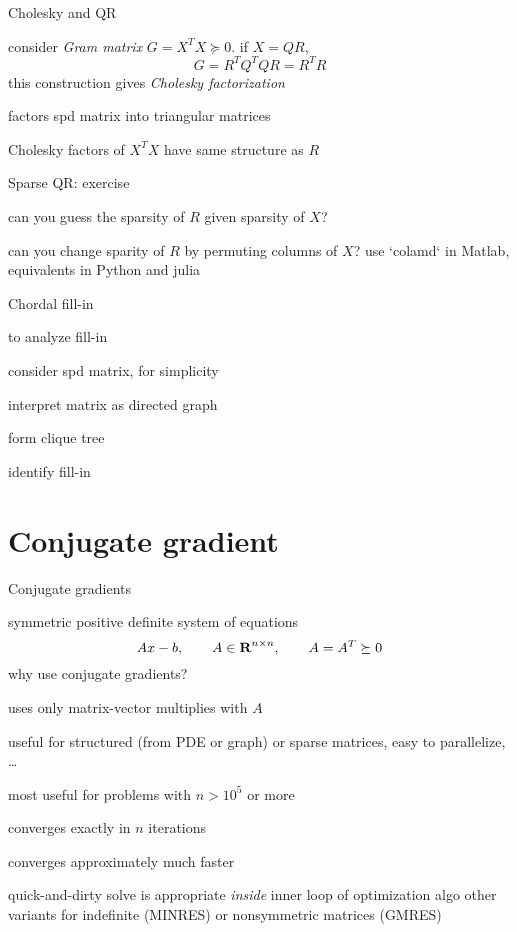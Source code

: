 \documentclass[presentation,xcolor={usenames,dvipsnames}]{beamer}
\begin{document}
\begin{frame}{Cholesky and QR}

consider \emph{Gram matrix} $G = X^T X \succeq 0$. if $X = QR$,
\[
G = R^T Q^T Q R = R^T R
\]
this construction gives \emph{Cholesky factorization} %
\bit
\item factors spd matrix into triangular matrices
\item Cholesky factors of $X^T X$ have same structure as $R$
\eit

\end{frame}

\begin{frame}{Sparse QR: exercise}

\bit
\item can you guess the sparsity of $R$ given sparsity of $X$?
\item can you change sparity of $R$ by permuting columns of $X$?
\eit
\pause use `colamd` in Matlab, equivalents in Python and julia

\end{frame}

\begin{frame}{Chordal fill-in}

to analyze fill-in
\bit
\item consider spd matrix, for simplicity
\item interpret matrix as directed graph
\item form clique tree
\item identify fill-in
\eit
{}


\end{frame}

\section{Conjugate gradient}

\begin{frame}{Conjugate gradients}

symmetric positive definite system of equations
\[
Ax - b, \qquad A\in{\mbox{\bf R}}^{n\times n}, \qquad A = A^T \succeq 0
\]
\pause
why use conjugate gradients?
\bit
\item uses only matrix-vector multiplies with $A$
\bit \item useful for structured (from PDE or graph) or sparse matrices, easy to parallelize, \ldots \eit
\item most useful for problems with $n>10^5$ or more
\item converges exactly in $n$ iterations
\item converges approximately much faster
\item quick-and-dirty solve is appropriate \emph{inside} inner loop of optimization algo
\eit
\pause
other variants for indefinite (MINRES) or nonsymmetric matrices (GMRES)

\end{frame}
\end{document}

